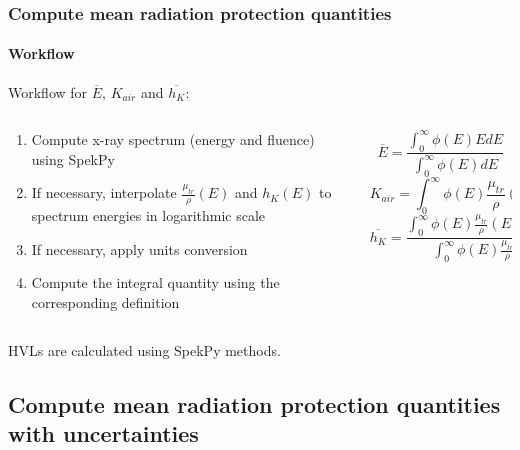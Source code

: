 \documentclass{beamer}
\newcommand{\highlight}[1]{{\color{blue} #1}}
\begin{document}
	\begin{frame}
		\frametitle{Compute mean radiation protection quantities}
		\framesubtitle{Workflow}
		Workflow for $\overline{E}$, $K_{air}$ and $\overline{h_K}$:
		\begin{columns}
			\begin{column}{0.55\textwidth}
				\begin{enumerate}
					\item Compute x-ray \highlight{spectrum} (energy and fluence) using SpekPy
					\item If necessary, \highlight{interpolate} $\frac{\mu_{tr}}{\rho}(E)$ and $h_K(E)$ to spectrum energies in logarithmic scale
					\item If necessary, apply \highlight{units} conversion
					\item Compute the \highlight{integral quantity} using the corresponding definition
				\end{enumerate}
			\end{column}
			\begin{column}{0.4\textwidth}
				\small
				$$\overline{E}=\frac{\int_{0}^{\infty}\phi(E)EdE}{\int_{0}^{\infty}\phi(E)dE}$$
				\bigskip
				$$K_{air}=\int_{0}^{\infty}\phi(E)\frac{\mu_{tr}}{\rho}(E)EdE$$
				\bigskip
				$$\overline{h_K}=\frac{\int_{0}^{\infty}\phi(E)\frac{\mu_{tr}}{\rho}(E)h_K(E)EdE}{\int_{0}^{\infty}\phi(E)\frac{\mu_{tr}}{\rho}(E)EdE}$$
			\end{column}
		\end{columns}
		\bigskip
		\highlight{HVLs} are calculated using SpekPy methods.
	\end{frame}
	
	\subsection{Compute mean radiation protection quantities with uncertainties}
	
\end{document}
